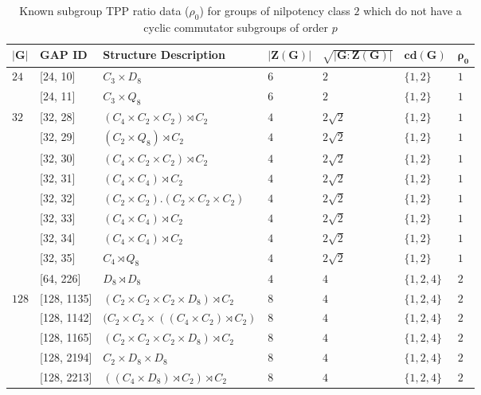 \documentclass{amsart}
\theoremstyle{observation}
\theoremstyle{definition}
\theoremstyle{remark}
\numberwithin{equation}{section}
\begin{document}
\begin{table}[H]
  \begin{center}
    \caption{Known subgroup TPP ratio data ($\rho_0$) for groups of nilpotency class $2$ which do not have a cyclic commutator subgroups of order $p$}
    \label{tbl:TblRho0GroupsOfTypeI}
    \begin{tabular}{lllllll}
      $\bm{|G|}$ & \multicolumn{1}{l}{\textbf{GAP ID}} & \multicolumn{1}{l}{\textbf{Structure Description}} & \multicolumn{1}{l}{$\bm{|Z(G)|}$} & \multicolumn{1}{l}{$\bm{\sqrt{|G:Z(G)|}}$} & \multicolumn{1}{l}{$\bm{\textbf{cd}(G)}$} & \multicolumn{1}{l}{$\bm{\rho_0}$} \\
      \toprule
        \multirow{2}{*}{$24$} &
            [24, 10] & $C_3 \times D_8$ & $6$ & $2$ & $\{1, 2\}$ & $1$ \\
          & [24, 11] & $C_3 \times Q_8$ & $6$ & $2$ & $\{1, 2\}$ & $1$ \\
        \hline
        \multirow{9}{*}{$32$} & 
            [32, 28] & $(C_4 \times C_2 \times C_2) \rtimes C_2$ & $4$ & $2\sqrt{2}$ & $\{1, 2\}$ & $1$ \\
        & [32, 29] & $(C_2 \times Q_8) \rtimes C_2$ & $4$ & $2\sqrt{2}$ & $\{1, 2\}$ & $1$ \\
        & [32, 30] & $(C_4 \times C_2 \times C_2) \rtimes C_2$ & $4$ & $2\sqrt{2}$ & $\{1, 2\}$  & $1$ \\
        & [32, 31] & $(C_4 \times C_4) \rtimes C_2$ & $4$ & $2\sqrt{2}$ & $\{1, 2\}$ & $1$ \\
        & [32, 32] & $(C_2 \times C_2) . (C_2 \times C_2 \times C_2)$ & $4$ & $2\sqrt{2}$ & $\{1, 2\}$ & $1$ \\
        & [32, 33] & $(C_4 \times C_4) \rtimes C_2$ & $4$ & $2\sqrt{2}$ & $\{1, 2\}$ & $1$ \\
        & [32, 34] & $(C_4 \times C_4) \rtimes C_2$ & $4$ & $2\sqrt{2}$ & $\{1, 2\}$ & $1$ \\
        & [32, 35] & $C_4 \rtimes Q_8$ & $4$ & $2\sqrt{2}$ & $\{1, 2\}$ & $1$ \\
        \hline
        \multirow{1}{*}{$64$} & 
            [64, 226] & $D_8 \rtimes D_8$ & $4$ & $4$ & $\{1, 2, 4\}$ & $2$ \\
        \hline
        \multirow{5}{*}{$128$} & 
            [128, 1135] & $(C_2 \times C_2 \times C_2 \times D_8) \rtimes C_2$ & $8$ & $4$ & $\{1, 2, 4\}$ & $2$ \\
         & [128, 1142] & $(C_2 \times C_2 \times ((C_4 \times C_2) \rtimes C_2)$ & $8$ & $4$ & $\{1, 2, 4\}$ & $2$ \\
         & [128, 1165] & $(C_2 \times C_2 \times C_2 \times D_8) \rtimes C_2$ & $8$ & $4$ & $\{1, 2, 4\}$ & $2$ \\
         & [128, 2194] & $C_2 \times D_8 \times D_8$ & $8$ & $4$ & $\{1, 2, 4\}$ & $2$ \\
         & [128, 2213] & $((C_4 \times D_8) \rtimes C_2) \rtimes C_2$ & $8$ & $4$ & $\{1, 2, 4\}$ & $2$ \\
    \end{tabular}
  \end{center}
\end{table}
\end{document}
